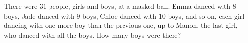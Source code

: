 There were $31$ people, girls and boys, at a masked ball. Emma danced with $8$ boys, Jade danced with $9$ boys, Chloe danced with $10$ boys, and so on, each girl dancing with one more boy than the previous one, up to Manon, the last girl, who danced with all the boys. How many boys were there?
